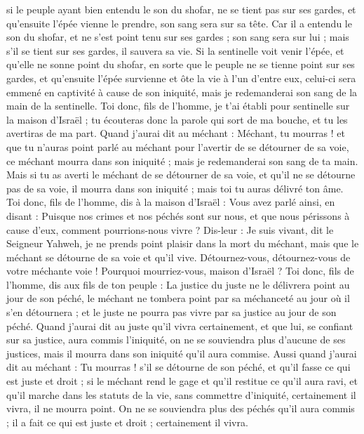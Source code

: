 \begin{multicols}{2}
si le peuple ayant bien entendu le son du shofar, ne se tient pas sur ses gardes, et qu'ensuite l'épée vienne le prendre, son sang sera sur sa tête.
Car il a entendu le son du shofar, et ne s'est point tenu sur ses gardes ; son sang sera sur lui ; mais s'il se tient sur ses gardes, il sauvera sa vie.
Si la sentinelle voit venir l'épée, et qu'elle ne sonne point du shofar, en sorte que le peuple ne se tienne point sur ses gardes, et qu'ensuite l'épée survienne et ôte la vie à l’un d'entre eux, celui-ci sera emmené en captivité à cause de son iniquité, mais je redemanderai son sang de la main de la sentinelle.
Toi donc, fils de l’homme, je t'ai établi pour sentinelle sur la maison d'Israël ; tu écouteras donc la parole qui sort de ma bouche, et tu les avertiras de ma part.
Quand j'aurai dit au méchant : Méchant, tu mourras ! et que tu n'auras point parlé au méchant pour l'avertir de se détourner de sa voie, ce méchant mourra dans son iniquité ; mais je redemanderai son sang de ta main.
Mais si tu as averti le méchant de se détourner de sa voie, et qu'il ne se détourne pas de sa voie, il mourra dans son iniquité ; mais toi tu auras délivré ton âme.
Toi donc, fils de l’homme, dis à la maison d'Israël : Vous avez parlé ainsi, en disant : Puisque nos crimes et nos péchés sont sur nous, et que nous périssons à cause d'eux, comment pourrions-nous vivre ?
Dis-leur : Je suis vivant, dit le Seigneur Yahweh, je ne prends point plaisir dans la mort du méchant, mais que le méchant se détourne de sa voie et qu'il vive. Détournez-vous, détournez-vous de votre méchante voie ! Pourquoi mourriez-vous, maison d'Israël ?
Toi donc, fils de l’homme, dis aux fils de ton peuple : La justice du juste ne le délivrera point au jour de son péché, le méchant ne tombera point par sa méchanceté au jour où il s'en détournera ; et le juste ne pourra pas vivre par sa justice au jour de son péché.
Quand j'aurai dit au juste qu'il vivra certainement, et que lui, se confiant sur sa justice, aura commis l'iniquité, on ne se souviendra plus d'aucune de ses justices, mais il mourra dans son iniquité qu'il aura commise.
Aussi quand j'aurai dit au méchant : Tu mourras ! s'il se détourne de son péché, et qu'il fasse ce qui est juste et droit ;
si le méchant rend le gage et qu'il restitue ce qu'il aura ravi, et qu'il marche dans les statuts de la vie, sans commettre d'iniquité, certainement il vivra, il ne mourra point.
On ne se souviendra plus des péchés qu'il aura commis ; il a fait ce qui est juste et droit ; certainement il vivra.

\end{multicols}
